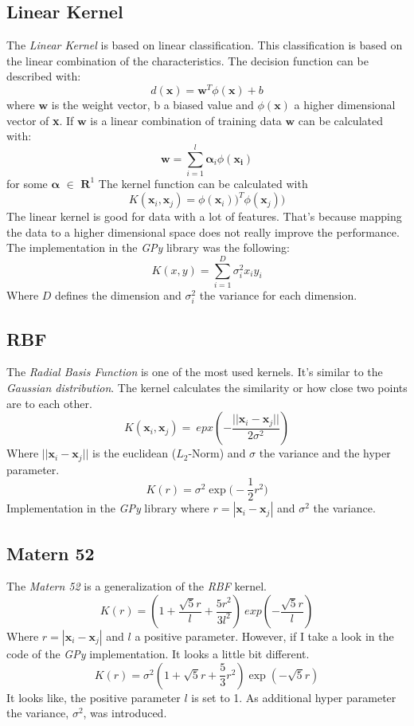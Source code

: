 \documentclass[10pt, a4paper, twocolumn]{article} %
\begin{document}
\subsection{Linear Kernel}
The \textit{Linear Kernel} is based on linear classification. This classification is based on the linear combination of the characteristics. The decision function can be described with: 
\[
d(\boldsymbol{x}) = \boldsymbol{w}^{T}\phi(\boldsymbol{x}) + b
\]
where $\boldsymbol{w}$ is the weight vector, b a biased value and $\phi(\boldsymbol{x})$ a higher dimensional vector of \textbf{x}. If $\boldsymbol{w}$ is a linear combination of training data $\boldsymbol{w}$ can be calculated with: 
\[
\boldsymbol{w} = \sum_{i=1}^{l}\boldsymbol{\alpha}_i\phi(\boldsymbol{x_i})
\]
for some $\boldsymbol{\alpha}$ $\in$ $\textbf{R}^{1}$
The kernel function can be calculated with 
\[
K(\boldsymbol{x}_{i}, \boldsymbol{x}_{j}) = \phi(\boldsymbol{x}_{i}))^{T}\phi(\boldsymbol{x}_{j}))
\]
\citep{linearKernel}
The linear kernel is good for data with a lot of features. That's because mapping the data to a higher dimensional space does not really improve the performance. 
\citep{linearKernelRecommended}
The implementation in the \textit{GPy} library was the following: 
\[
K(x,y) = \sum_{i=1}^{D} \sigma^2_i x_iy_i
\]
Where $D$ defines the dimension and $\sigma^2_i$ the variance for each dimension.

\subsection{RBF}
The \textit{Radial Basis Function} is one of the most used kernels. It's similar to the \textit{Gaussian distribution}. The kernel calculates the similarity or how close two points are to each other. 
\[
K(\boldsymbol{x}_{i}, \boldsymbol{x}_{j}) = \:epx(-\frac{||\boldsymbol{x}_{i} - \boldsymbol{x}_{j}||}{2\sigma^{2}})
\]
Where $||\boldsymbol{x}_{i} - \boldsymbol{x}_{j}||$ is the euclidean ($L_{2}$-Norm) and $\sigma$ the variance and the hyper parameter.
\citep{rbfKernel}
\[
K(r) = \sigma^2 \exp \bigg(- \frac{1}{2} r^2 \bigg)
\]
Implementation in the \textit{GPy} library where $r = |\boldsymbol{x}_{i} - \boldsymbol{x}_{j}|$ and $\sigma^2$ the variance.

\subsection{Matern 52}
The \textit{Matern 52} is a generalization of the \textit{RBF} kernel. 
\[
K(r) = (1 + \frac{\sqrt{5}r}{l} + \frac{5r^{2}}{3l^{2}})\:exp(-\frac{\sqrt{5}r}{l})
\]
Where $r = |\boldsymbol{x}_{i} - \boldsymbol{x}_{j}|$ and $l$ a positive parameter.\citep{maternKernel}
However, if I take a look in the code of the \textit{GPy} implementation. It looks a little bit different.
\[
K(r) = \sigma^2 (1 + \sqrt{5} r + \frac{5}{3} r^2) \exp(- \sqrt{5} r)
\]
It looks like, the positive parameter $l$ is set to 1. As additional hyper parameter the variance, $\sigma^{2}$, was introduced. 
\end{document}

